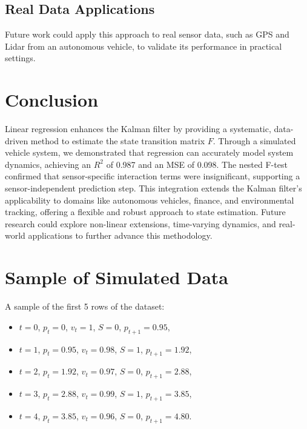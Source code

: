 \documentclass[12pt]{article}
\begin{document}
\subsection{Real Data Applications}
Future work could apply this approach to real sensor data, such as GPS and Lidar from an autonomous vehicle, to validate its performance in practical settings.

\section{Conclusion}
\label{sec:conclusion}

Linear regression enhances the Kalman filter by providing a systematic, data-driven method to estimate the state transition matrix \( F \). Through a simulated vehicle system, we demonstrated that regression can accurately model system dynamics, achieving an \( R^2 \) of 0.987 and an MSE of 0.098. The nested F-test confirmed that sensor-specific interaction terms were insignificant, supporting a sensor-independent prediction step. This integration extends the Kalman filter’s applicability to domains like autonomous vehicles, finance, and environmental tracking, offering a flexible and robust approach to state estimation. Future research could explore non-linear extensions, time-varying dynamics, and real-world applications to further advance this methodology.

\appendix

\section{Sample of Simulated Data}
\label{app:data}

A sample of the first 5 rows of the dataset:
\begin{itemize}
    \item \( t = 0 \), \( p_t = 0 \), \( v_t = 1 \), \( S = 0 \), \( p_{t+1} = 0.95 \),
    \item \( t = 1 \), \( p_t = 0.95 \), \( v_t = 0.98 \), \( S = 1 \), \( p_{t+1} = 1.92 \),
    \item \( t = 2 \), \( p_t = 1.92 \), \( v_t = 0.97 \), \( S = 0 \), \( p_{t+1} = 2.88 \),
    \item \( t = 3 \), \( p_t = 2.88 \), \( v_t = 0.99 \), \( S = 1 \), \( p_{t+1} = 3.85 \),
    \item \( t = 4 \), \( p_t = 3.85 \), \( v_t = 0.96 \), \( S = 0 \), \( p_{t+1} = 4.80 \).
\end{itemize}
\end{document}
